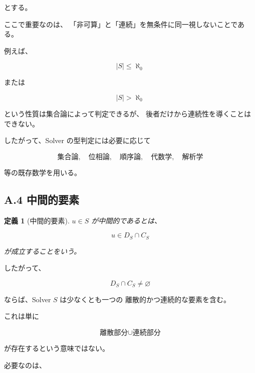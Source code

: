\documentclass[a4paper,11pt]{article}
\newtheorem{definition}{定義}[section]
\begin{document}
とする。

ここで重要なのは、
「非可算」と「連続」を無条件に同一視しないことである。

例えば、

\begin{equation}
    |S|\leq\aleph_0
\end{equation}

または

\begin{equation}
    |S|>\aleph_0
\end{equation}

という性質は集合論によって判定できるが、
後者だけから連続性を導くことはできない。

したがって、Solver の型判定には必要に応じて

\begin{equation}
    \text{集合論},
    \quad
    \text{位相論},
    \quad
    \text{順序論},
    \quad
    \text{代数学},
    \quad
    \text{解析学}
\end{equation}

等の既存数学を用いる。


\subsection{A.4 中間的要素}

\begin{definition}[中間的要素]
$u\in S$ が中間的であるとは、

\begin{equation}
    u\in D_S\cap C_S
\end{equation}

が成立することをいう。
\end{definition}

したがって、

\begin{equation}
    D_S\cap C_S\neq\varnothing
\end{equation}

ならば、Solver $S$ は少なくとも一つの
離散的かつ連続的な要素を含む。

これは単に

\begin{equation}
    \text{離散部分}\cup\text{連続部分}
\end{equation}

が存在するという意味ではない。

必要なのは、
\end{document}
